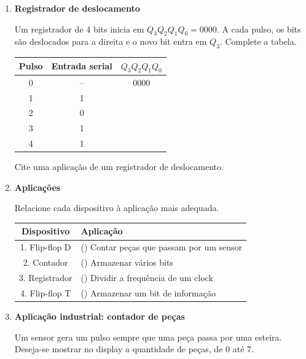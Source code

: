 \documentclass[a4paper,12pt]{article}
\begin{document}
\begin{enumerate}[leftmargin=0.8cm,label=\textbf{\arabic*.},itemsep=0.65cm]
\item \textbf{Registrador de deslocamento}

Um registrador de 4 bits inicia em $Q_3Q_2Q_1Q_0=0000$. A cada pulso, os bits
são deslocados para a direita e o novo bit entra em $Q_3$. Complete a tabela.

\begin{center}
\renewcommand{\arraystretch}{1.5}
\begin{tabular}{|c|c|c|}
\hline
\textbf{Pulso} & \textbf{Entrada serial} & $Q_3Q_2Q_1Q_0$ \\
\hline
0 & -- & 0000 \\
\hline
1 & 1 & \\
\hline
2 & 0 & \\
\hline
3 & 1 & \\
\hline
4 & 1 & \\
\hline
\end{tabular}
\end{center}

Cite uma aplicação de um registrador de deslocamento.

\vspace{1cm}

\newpage

\item \textbf{Aplicações}

Relacione cada dispositivo à aplicação mais adequada.

\begin{center}
\renewcommand{\arraystretch}{1.5}
\begin{tabularx}{0.95\textwidth}{|c|>{\raggedright\arraybackslash}X|}
\hline
\textbf{Dispositivo} & \textbf{Aplicação} \\
\hline
1. Flip-flop D & (\quad) Contar peças que passam por um sensor \\
\hline
2. Contador & (\quad) Armazenar vários bits \\
\hline
3. Registrador & (\quad) Dividir a frequência de um clock \\
\hline
4. Flip-flop T & (\quad) Armazenar um bit de informação \\
\hline
\end{tabularx}
\end{center}

\item \textbf{Aplicação industrial: contador de peças}

Um sensor gera um pulso sempre que uma peça passa por uma esteira. Deseja-se
mostrar no display a quantidade de peças, de 0 até 7.


\end{enumerate}
\end{document}
